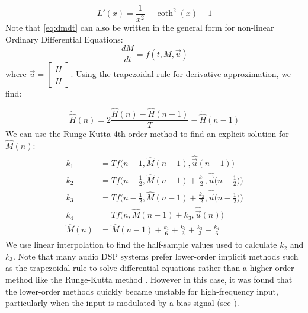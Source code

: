 \documentclass[twoside,a4paper]{article}
\begin{document}
\begin{equation}
    L'(x) = \frac{1}{x^2} - \coth^2(x) + 1
\end{equation}
%
Note that \cref{eq:dmdt} can also be written in the general form for non-linear
Ordinary Differential Equations:
\begin{equation}
    \frac{dM}{dt} = f(t,M,\vec{u})
\end{equation}
where $\vec{u} = \begin{bmatrix}
    H \\
    \dot{H}
    \end{bmatrix}$.
\newline\newline
Using the trapezoidal rule for derivative approximation, we find:

\begin{equation}
    \dot{\hat{H}}(n) = 2\frac{\hat{H}(n) - \hat{H}(n-1)}{T} - \dot{\hat{H}}(n-1)
    \label{eq:hDeriv}
\end{equation}
%
We can use the Runge-Kutta 4th-order method \cite{Yeh} to find an explicit solution
for $\hat{M}(n)$:
\begin{align}
\begin{split}
    k_1 &= T f \Big(n-1, \hat{M}(n-1), \hat{\vec{u}}(n-1) \Big)\\
    k_2 &= T f \Big(n - \frac{1}{2}, \hat{M}(n-1) + \frac{k_1}{2}, \hat{\vec{u}}  \Big(n-\frac{1}{2} \Big) \Big)\\
    k_3 &= T f \Big(n- \frac{1}{2}, \hat{M}(n-1) + \frac{k_2}{2}, \hat{\vec{u}} \Big(n-\frac{1}{2} \Big) \Big)\\
    k_4 &= T f \Big(n, \hat{M}(n-1) + k_3, \hat{\vec{u}}(n) \Big)\\
    \hat{M}(n) &= \hat{M}(n-1) + \frac{k_1}{6} + \frac{k_2}{3} + \frac{k_3}{3} + \frac{k_4}{6}
    \label{eq:Mn}
\end{split}
\end{align}
%
We use linear interpolation to find the half-sample values used to calculate $k_2$ and $k_3$.
Note that many audio DSP systems prefer
lower-order implicit methods such as the trapezoidal rule to solve
differential equations rather than a higher-order method like the
Runge-Kutta method \cite{Yeh}. However in this case, it was found that
the lower-order methods quickly became unstable for high-frequency input,
particularly when the input is modulated by a bias signal (see ).
\end{document}
